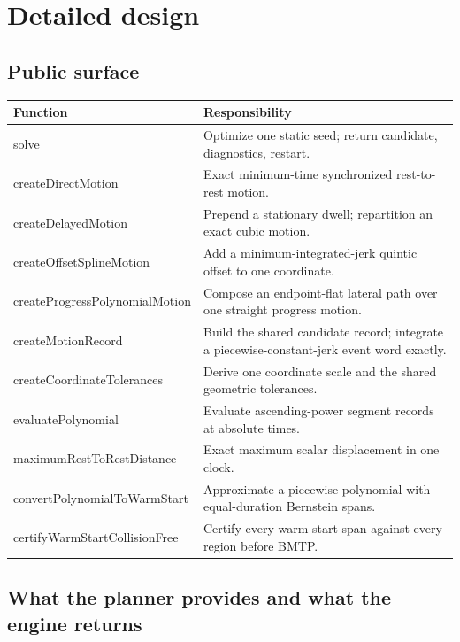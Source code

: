\documentclass[11pt]{article}
\begin{document}
\section{Detailed design}

\subsection{Public surface}

\small
\begin{tabularx}{\textwidth}{@{}>{\ttfamily\raggedright\arraybackslash}p{}X@{}}
\toprule
\normalfont Function & Responsibility \\
\midrule
solve & Optimize one static seed; return candidate, diagnostics, restart. \\
createDirectMotion & Exact minimum-time synchronized rest-to-rest motion. \\
createDelayedMotion & Prepend a stationary dwell; repartition an exact cubic motion. \\
createOffsetSplineMotion & Add a minimum-integrated-jerk quintic offset to one coordinate. \\
createProgressPolynomialMotion & Compose an endpoint-flat lateral path over one straight progress motion. \\
createMotionRecord & Build the shared candidate record; integrate a piecewise-constant-jerk event word exactly. \\
createCoordinateTolerances & Derive one coordinate scale and the shared geometric tolerances. \\
evaluatePolynomial & Evaluate ascending-power segment records at absolute times. \\
maximumRestToRestDistance & Exact maximum scalar displacement in one clock. \\
convertPolynomialToWarmStart & Approximate a piecewise polynomial with equal-duration Bernstein spans. \\
certifyWarmStartCollisionFree & Certify every warm-start span against every region before BMTP. \\
\bottomrule
\end{tabularx}
\normalsize

\subsection{What the planner provides and what the engine returns}
\end{document}
